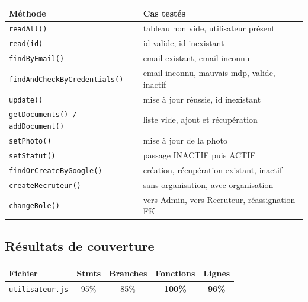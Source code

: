 \documentclass[12pt,a4paper]{article}
\begin{document}
\vspace{0.5em}
\begin{center}
\begin{tabular}{ll}
\toprule
\textbf{Méthode} & \textbf{Cas testés} \\
\midrule
\rowcolor{rowgray}
\texttt{readAll()} & tableau non vide, utilisateur présent \\
\texttt{read(id)} & id valide, id inexistant \\
\rowcolor{rowgray}
\texttt{findByEmail()} & email existant, email inconnu \\
\texttt{findAndCheckByCredentials()} & email inconnu, mauvais mdp, valide, inactif \\
\rowcolor{rowgray}
\texttt{update()} & mise à jour réussie, id inexistant \\
\texttt{getDocuments() / addDocument()} & liste vide, ajout et récupération \\
\rowcolor{rowgray}
\texttt{setPhoto()} & mise à jour de la photo \\
\texttt{setStatut()} & passage INACTIF puis ACTIF \\
\rowcolor{rowgray}
\texttt{findOrCreateByGoogle()} & création, récupération existant, inactif \\
\texttt{createRecruteur()} & sans organisation, avec organisation \\
\rowcolor{rowgray}
\texttt{changeRole()} & vers Admin, vers Recruteur, réassignation FK \\
\bottomrule
\end{tabular}
\end{center}

\subsection{Résultats de couverture}

\vspace{0.5em}
\begin{center}
\begin{tabular}{lcccc}
\toprule
\textbf{Fichier} & \textbf{Stmts} & \textbf{Branches} & \textbf{Fonctions} & \textbf{Lignes} \\
\midrule
\texttt{utilisateur.js} & 95\% & 85\% & \textcolor{okgreen}{\textbf{100\%}} & \textcolor{okgreen}{\textbf{96\%}} \\
\bottomrule
\end{tabular}
\end{center}

\newpage
\end{document}
